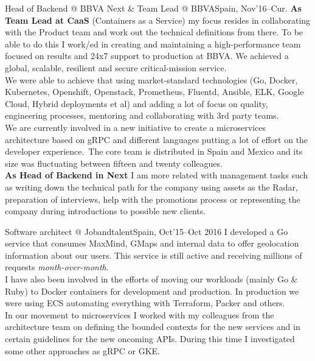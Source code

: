 \documentclass[11pt, a4paper, sans]{moderncv}
\begin{document}
\makecvtitle\vspace{-2.5em}

%
% 


\cventry{}{}
{Head of Backend @ BBVA Next \& Team Lead @ BBVA}{Spain, Nov'16--Cur.}
{}{\vspace{-1em}
\textbf{As Team Lead at CaaS} (Containers as a Service) my focus resides in collaborating with the Product team and work out the technical definitions from there. To be able to do this I work/ed in creating and maintaining a high-performance team focused on results and 24x7 support to production at BBVA. We achieved a global, scalable, resilient and secure critical-mission service.\\
We were able to achieve that using market-standard technologies (Go, Docker, Kubernetes, Openshift, Openstack, Prometheus, Fluentd, Ansible, ELK, Google Cloud, Hybrid deployments et al) and adding a lot of focus on quality, engineering processes, mentoring and collaborating with 3rd party teams.\\
We are currently involved in a new initiative to create a microservices architecture based on gRPC and different languages putting a lot of effort on the developer experience.\
The core team is distributed in Spain and Mexico and its size was fluctuating between fifteen and twenty colleagues.\\
\textbf{As Head of Backend in Next} I am more related with management tasks such as writing down the technical path for the company using assets as the Radar, preparation of interviews, help with the promotions process or representing the company during introductions to possible new clients.\\}

\cventry{}{}
{Software architect @ Jobandtalent}{Spain, Oct'15--Oct 2016}
{}{\vspace{-1em}
I developed a Go service that consumes MaxMind, GMaps and internal data to offer geolocation information about our users.
This service is still active and receiving millions of requests \textit{month-over-month}.\\
I have also been involved in the efforts of moving our workloads (mainly Go \& Ruby) to Docker containers for development and production.
In production we were using ECS automating everything with Terraform, Packer and others.\\
In our movement to microservices I worked with my colleagues from the architecture team on defining the bounded contexts for the new services and in certain guidelines for the new oncoming APIs.
During this time I investigated some other approaches as gRPC or GKE.\\}
\end{document}
